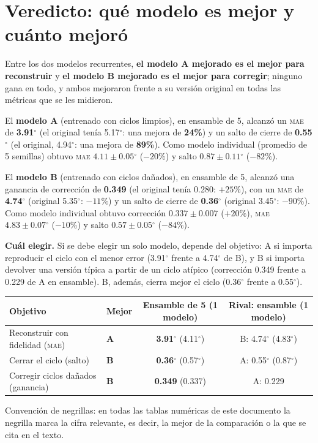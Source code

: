 \documentclass[11pt,a4paper]{article}
\newcommand{\gr}{$^\circ$}
\newcommand{\mae}{\textsc{mae}}
\begin{document}
\section{Veredicto: qué modelo es mejor y cuánto mejoró}
\label{sec:veredicto}

\begin{resultado}
Entre los dos modelos recurrentes, \textbf{el modelo A mejorado es el mejor para reconstruir} y \textbf{el modelo B mejorado es el mejor para corregir}; ninguno gana en todo, y ambos mejoraron frente a su versión original en todas las métricas que se les midieron.

El \textbf{modelo A} (entrenado con ciclos limpios), en ensamble de 5, alcanzó un \mae{} de \textbf{3.91\gr} (el original tenía 5.17\gr: una mejora de \textbf{24\%}) y un salto de cierre de \textbf{0.55\gr} (el original, 4.94\gr: una mejora de \textbf{89\%}). Como modelo individual (promedio de 5 semillas) obtuvo \mae{} $4.11\pm0.05$\gr{} ($-20\%$) y salto $0.87\pm0.11$\gr{} ($-82\%$).

El \textbf{modelo B} (entrenado con ciclos dañados), en ensamble de 5, alcanzó una ganancia de corrección de \textbf{0.349} (el original tenía 0.280: \textbf{$+25\%$}), con un \mae{} de \textbf{4.74\gr} (original 5.35\gr: $-11\%$) y un salto de cierre de \textbf{0.36\gr} (original 3.45\gr: $-90\%$). Como modelo individual obtuvo corrección $0.337\pm0.007$ ($+20\%$), \mae{} $4.83\pm0.07$\gr{} ($-10\%$) y salto $0.57\pm0.05$\gr{} ($-84\%$).
\end{resultado}

\textbf{Cuál elegir.} Si se debe elegir un solo modelo, depende del objetivo: A si importa reproducir el ciclo con el menor error (3.91\gr{} frente a 4.74\gr{} de B), y B si importa devolver una versión típica a partir de un ciclo atípico (corrección 0.349 frente a 0.229 de A en ensamble). B, además, cierra mejor el ciclo (0.36\gr{} frente a 0.55\gr).

\begin{center}
\footnotesize
\setlength{\tabcolsep}{4pt}
\begin{tabular}{llcc}
\toprule
\textbf{Objetivo} & \textbf{Mejor} & \textbf{Ensamble de 5 (1 modelo)} & \textbf{Rival: ensamble (1 modelo)} \\
\midrule
Reconstruir con fidelidad (\mae{}) & \textbf{A} & \textbf{3.91\gr} (4.11\gr) & B: 4.74\gr{} (4.83\gr) \\
Cerrar el ciclo (salto) & \textbf{B} & \textbf{0.36\gr} (0.57\gr) & A: 0.55\gr{} (0.87\gr) \\
Corregir ciclos dañados (ganancia) & \textbf{B} & \textbf{0.349} (0.337) & A: 0.229 \\
\bottomrule
\end{tabular}
\end{center}
{\small Convención de negrillas: en todas las tablas numéricas de este documento la negrilla marca la cifra relevante, es decir, la mejor de la comparación o la que se cita en el texto.}
\end{document}
